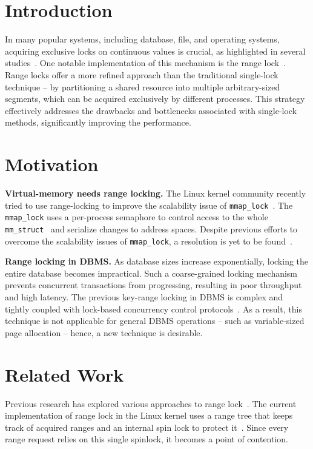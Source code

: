 \section{Introduction}
In many popular systems, including database, file, and operating systems, acquiring exclusive locks on continuous values is crucial, as highlighted in several studies~\parencite{lomet1993key, readerWriterLocks2017, graefe2007hierarchical, lee2021concurrent, gao2023citron, lee2019write}. One notable implementation of this mechanism is the range lock~\parencite{gao2023citron, kogan2020scalable}.
Range locks offer a more refined approach than the traditional single-lock technique -- by partitioning a shared resource into multiple arbitrary-sized segments, which can be acquired exclusively by different processes.
This strategy effectively addresses the drawbacks and bottlenecks associated with single-lock methods, significantly improving the performance.

\section{Motivation}

\textbf{Virtual-memory needs range locking.}
The Linux kernel community recently tried to use range-locking to improve the scalability issue of \texttt{mmap\_lock}~\parencite{readerWriterLocks2017, mapleTree2021, mmapLock2022}. The \texttt{mmap\_lock} uses a per-process semaphore to control access to the whole \texttt{mm\_struct}~\parencite{mmstruct2023} and serialize changes to address spaces. Despite previous efforts to overcome the scalability issues of \texttt{mmap\_lock}, a resolution is yet to be found~\parencite{mmapLock2022}.

\textbf{Range locking in DBMS.}
As database sizes increase exponentially, locking the entire database becomes impractical.
Such a coarse-grained locking mechanism prevents concurrent transactions from progressing, resulting in poor throughput and high latency.
The previous key-range locking in DBMS is complex and tightly coupled with lock-based concurrency control protocols~\parencite{graefe2007hierarchical, andy2022database}.
As a result, this technique is not applicable for general DBMS operations -- such as variable-sized page allocation -- hence, a new technique is desirable.

\section{Related Work}
Previous research has explored various approaches to range lock~\parencite{linuxRangeLockImpl2013, song2013parallelizing, kogan2020scalable}. The current implementation of range lock in the Linux kernel uses a range tree that keeps track of acquired ranges and an internal spin lock to protect it~\parencite{linuxRangeLockImpl2013}. Since every range request relies on this single spinlock, it becomes a point of contention. 

